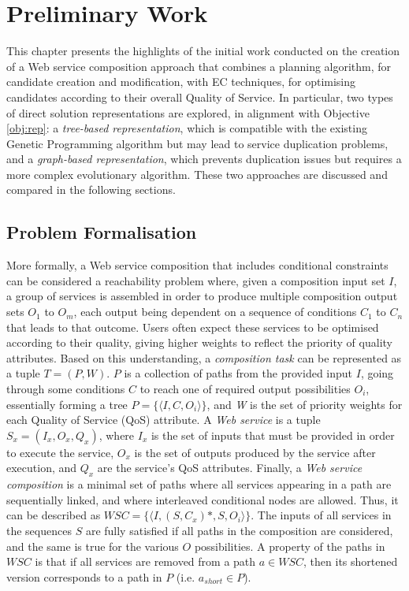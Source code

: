 \chapter{Preliminary Work}\label{C:preliminary}

This chapter presents the highlights of the initial work conducted on the creation of a Web service composition approach that combines a planning algorithm, for candidate creation and modification, with EC techniques, for optimising candidates according to their overall Quality of Service. In particular, two types of direct solution representations are explored, in alignment with Objective \ref{obj:rep}: a \textit{tree-based representation}, which is compatible with the existing Genetic Programming algorithm but may lead to service duplication problems, and a \textit{graph-based representation}, which prevents duplication issues but requires a more complex evolutionary algorithm. These two approaches are discussed and compared in the following sections.

\section{Problem Formalisation}

More formally, a Web service composition that includes conditional constraints can be considered a reachability problem where, given a composition input set $I$, a group of services is assembled in order to produce multiple composition output sets $O_1$ to $O_m$, each output being dependent on a sequence of conditions $C_1$ to $C_n$ that leads to that outcome. Users often expect these services to be optimised according to their quality, giving higher weights to reflect the priority of quality attributes. Based on this understanding, a \textit{composition task} can be represented as a tuple $T = (P, W)$. $P$ is a collection of paths from the provided input $I$, going through some conditions $C$ to reach one of required output possibilities $O_i$, essentially forming a tree $P = \{\langle I,C,O_i\rangle\}$, and \textit{W} is the set of priority weights for each Quality of Service (QoS) attribute. A \textit{Web service} is a tuple $S_x = (I_x, O_x, Q_x)$, where $I_x$ is the set of inputs that must be provided in order to execute the service, $O_x$ is the set of outputs produced by the service after execution, and $Q_x$ are the service's QoS attributes. Finally, a \textit{Web service composition} is a minimal set of paths where all services appearing in a path are sequentially linked, and where interleaved conditional nodes are allowed. Thus, it can be described as $WSC = \{\langle I,(S,C_x)*,S,O_i\rangle\}$. The inputs of all services in the sequences $S$ are fully satisfied if all paths in the composition are considered, and the same is true for the various $O$ possibilities. A property of the paths in $WSC$ is that if all services are removed from a path $a \in WSC$, then its shortened version corresponds to a path in $P$ (i.e. $a_{short} \in P$).

